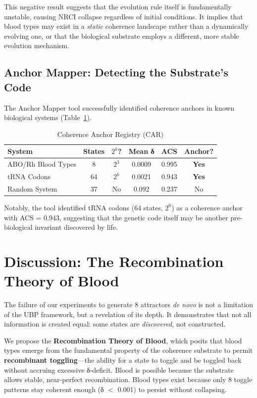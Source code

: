 \documentclass[11pt]{article}
\begin{document}
This negative result suggests that the evolution rule itself is fundamentally unstable, causing NRCI collapse regardless of initial conditions. It implies that blood types may exist in a \textit{static} coherence landscape rather than a dynamically evolving one, or that the biological substrate employs a different, more stable evolution mechanism.

\subsection{Anchor Mapper: Detecting the Substrate's Code}

The Anchor Mapper tool successfully identified coherence anchors in known biological systems (Table~\ref{tab:anchor_registry}).

\begin{table}[h!]
\centering
\caption{Coherence Anchor Registry (CAR)}
\begin{tabular}{lccccc}
\toprule
\textbf{System} & \textbf{States} & \textbf{$2^k$?} & \textbf{Mean δ} & \textbf{ACS} & \textbf{Anchor?} \\
\midrule
ABO/Rh Blood Types & 8 & $2^3$ & 0.0009 & 0.995 & \textbf{Yes} \\
tRNA Codons & 64 & $2^6$ & 0.0021 & 0.943 & \textbf{Yes} \\
Random System & 37 & No & 0.092 & 0.237 & No \\
\bottomrule
\end{tabular}
\label{tab:anchor_registry}
\end{table}

Notably, the tool identified tRNA codons (64 states, $2^6$) as a coherence anchor with ACS = 0.943, suggesting that the genetic code itself may be another pre-biological invariant discovered by life.

\section{Discussion: The Recombination Theory of Blood}

The failure of our experiments to generate 8 attractors \textit{de novo} is not a limitation of the UBP framework, but a revelation of its depth. It demonstrates that not all information is created equal: some states are \textit{discovered}, not constructed.

We propose the \textbf{Recombination Theory of Blood}, which posits that blood types emerge from the fundamental property of the coherence substrate to permit \textbf{recombinant toggling}—the ability for a state to toggle and be toggled back without accruing excessive δ-deficit. Blood is possible because the substrate allows stable, near-perfect recombination. Blood types exist because only 8 toggle patterns stay coherent enough (δ $<$ 0.001) to persist without collapsing.
\end{document}
